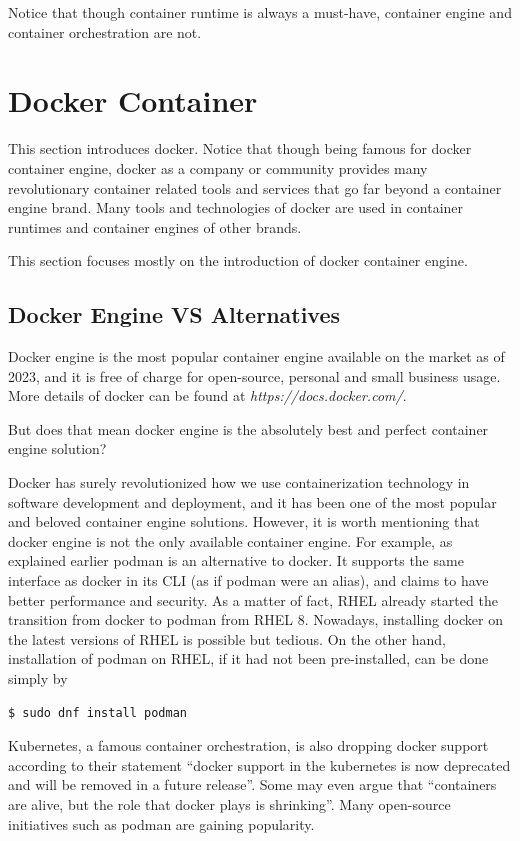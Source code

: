 Notice that though container runtime is always a must-have, container engine and container orchestration are not.

\section{Docker Container} \label{ch:vac:sec:dc}

This section introduces docker. Notice that though being famous for docker container engine, docker as a company or community provides many revolutionary container related tools and services that go far beyond a container engine brand. Many tools and technologies of docker are used in container runtimes and container engines of other brands.

This section focuses mostly on the introduction of docker container engine.

\subsection{Docker Engine VS Alternatives}

Docker engine is the most popular container engine available on the market as of 2023, and it is free of charge for open-source, personal and small business usage. More details of docker can be found at \textit{https://docs.docker.com/}.

But does that mean docker engine is the absolutely best and perfect container engine solution?

Docker has surely revolutionized how we use containerization technology in software development and deployment, and it has been one of the most popular and beloved container engine solutions. However, it is worth mentioning that docker engine is not the only available container engine. For example, as explained earlier podman is an alternative to docker. It supports the same interface as docker in its CLI (as if podman were an alias), and claims to have better performance and security. As a matter of fact, RHEL already started the transition from docker to podman from RHEL 8. Nowadays, installing docker on the latest versions of RHEL is possible but tedious. On the other hand, installation of podman on RHEL, if it had not been pre-installed, can be done simply by
\begin{lstlisting}
$ sudo dnf install podman
\end{lstlisting}
Kubernetes, a famous container orchestration, is also dropping docker support according to their statement ``docker support in the kubernetes is now deprecated and will be removed in a future release''. Some may even argue that ``containers are alive, but the role that docker plays is shrinking''. Many open-source initiatives such as podman are gaining popularity.

